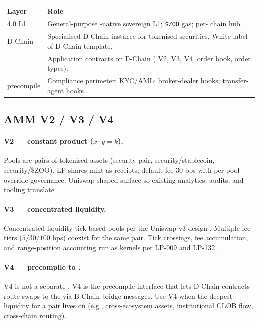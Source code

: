 \begin{longtable}{p{}p{}}
\toprule
\textbf{Layer} & \textbf{Role} \\
\midrule
\Zoo{} 4.0 L1 \cite{zoo-4-0} & General-purpose \GPU{}-native sovereign L1; \texttt{\$ZOO} gas; per-\LLM{} chain hub. \\
\Zoo{} D-Chain & Specialised D-Chain instance for tokenised securities. White-label of \Lux{} D-Chain template. \\
\Zoo{} \DEX{} & Application contracts on \Zoo{} D-Chain (\AMM{} V2, V3, V4, order book, order types). \\
\Liquidity{} precompile & Compliance perimeter; KYC/AML; broker-dealer hooks; transfer-agent hooks. \\
\bottomrule
\end{longtable}

\subsection{AMM V2 / V3 / V4}

\paragraph{V2 --- constant product ($x \cdot y = k$).}
Pools are pairs of tokenised assets (security pair, security/stablecoin,
security/\$ZOO). LP shares mint as receipts; default fee 30 bps with
per-pool override governance. Uniswap-shaped surface so existing
analytics, audits, and tooling translate.

\paragraph{V3 --- concentrated liquidity.}
Concentrated-liquidity tick-based pools per the Uniswap v3 design
\cite{uniswap-v3}. Multiple fee tiers ($5/30/100$ bps) coexist for
the same pair. Tick crossings, fee accumulation, and range-position
accounting run as \GPU{} kernels per LP-009 \cite{lp-009} and
LP-132 \cite{lp-132}.

\paragraph{V4 --- precompile to \Lux{} \DEX{}.}
V4 is not a separate \AMM{}. V4 is the precompile interface that lets
\Zoo{} D-Chain contracts route swaps to the \Lux{} \DEX{}
\cite{lux-dex} via B-Chain bridge messages. Use V4 when the deepest
liquidity for a pair lives on \Lux{} (e.g., cross-ecosystem assets,
institutional CLOB flow, cross-chain routing).

